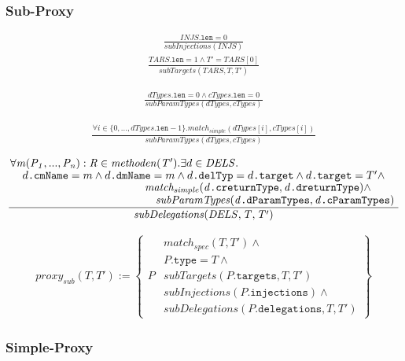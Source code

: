 \documentclass[a4paper,12pt]{article}
\begin{document}
\subsubsection{Sub-Proxy}

\begin{gather*}
\frac{\mathit{INJS}\texttt{.len} = 0}{\mathit{subInjections(INJS)}}
\end{gather*}
\begin{gather*}
\frac{\mathit{TARS}\texttt{.len} = 1 \wedge T' = \mathit{TARS}[0]}{\mathit{subTargets(TARS,T,T')}}
\end{gather*}

\begin{gather*}
\frac{\mathit{dTypes}\texttt{.len} = 0 \wedge \mathit{cTypes}\texttt{.len} = 0}{\mathit{subParamTypes(dTypes, cTypes)}}
\end{gather*}

\begin{gather*}
\frac{\forall i \in \mathit{\{0},...,\mathit{dTypes\texttt{.len}-1\}}.\mathit{match_{simple}(dTypes[i], cTypes[i])} }{\mathit{subParamTypes(dTypes, cTypes)}}
\end{gather*}

\begin{gather*}
\frac{\splitfrac{\forall \mathit{m(P_1,...,P_n):R} \in \mathit{methoden(T')}.\exists d \in \mathit{DELS}.}
{\splitfrac{d\texttt{.cmName} = m \wedge d\texttt{.dmName} = m \wedge d\texttt{.delTyp} = d\texttt{.target} \wedge d\texttt{.target} = T' \wedge}{\splitfrac{\mathit{match_{simple}(d\texttt{.creturnType}, d\texttt{.dreturnType})}\wedge }
{ \mathit{subParamTypes(d\texttt{.dParamTypes}, d\texttt{.cParamTypes})}}
}}}
{\mathit{subDelegations(DELS,T,T')}}
\end{gather*}


\begin{gather*}
proxy_{sub}(T,T') := 
\left\{\begin{array}{l|l}
		& \mathit{match_{spec}(T,T')} \wedge \\
		& P\texttt{.type} = T \wedge \\
P		& \mathit{subTargets(P\texttt{.targets},T,T')} \\
		& \mathit{subInjections(P\texttt{.injections})}  \wedge \\
		& \mathit{subDelegations(P\texttt{.delegations},T,T')}
\end{array}
\right\}
\end{gather*}


\subsubsection{Simple-Proxy}
\end{document}
